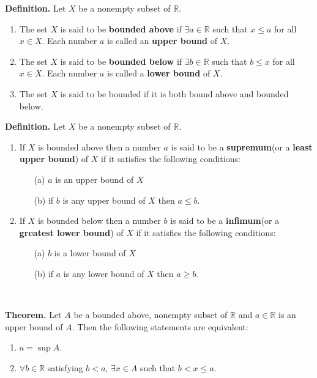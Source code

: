 \documentclass[12pt,a4paper]{article}
\begin{document}
\begin{tcolorbox}[colback=white]
	\textbf{Definition.} Let $X$ be a nonempty subset of $\mathbb{R}$. \begin{enumerate}
		\item The set $X$ is said to be \textbf{bounded above} if $\exists a\in\mathbb{R}$ such that $x\leq a$ for all $x\in X$. Each number $a$ is called an \textbf{upper bound} of $X$.
		\item The set $X$ is said to be \textbf{bounded below} if $\exists b\in\mathbb{R}$ such that $b\leq x$ for all $x\in X$. Each number $a$ is called a \textbf{lower bound} of $X$.
		\item The set $X$ is said to be bounded if it is both bound above and bounded below.
	\end{enumerate}
\end{tcolorbox}
\begin{tcolorbox}[colback=white]
	\textbf{Definition.} Let $X$ be a nonempty subset of $\mathbb{R}$. \begin{enumerate}
		\item If $X$ is bounded above then a number $a$ is said to be a \textbf{supremum}(or a \textbf{least upper bound}) of $X$ if it satisfies the following conditions: \begin{itemize}
			\item[(a)] $a$ is an upper bound of $X$
			\item[(b)] if $b$ is any upper bound of $X$ then $a\leq b$.
		\end{itemize}
		\item If $X$ is bounded below then a number $b$ is said to be a \textbf{infimum}(or a \textbf{greatest lower bound}) of $X$ if it satisfies the following conditions: \begin{itemize}
			\item[(a)] $b$ is a lower bound of $X$
			\item[(b)] if $a$ is any lower bound of $X$ then $a\geq b$.
		\end{itemize}
	\end{enumerate}
\end{tcolorbox}
\
\begin{tcolorbox}[colback=white]
	\textbf{Theorem.} Let $A$ be a bounded above, nonempty subset of $\mathbb{R}$ and $a\in\mathbb{R}$ is an upper bound of $A$. Then the following statements are equivalent: \begin{enumerate}
		\item $a=\sup A$.
		\item $\forall b\in\mathbb{R}$ satisfying $b<a$, $\exists x\in A$ such that $b<x\leq a$.
	\end{enumerate}
\end{tcolorbox}
\end{document}
